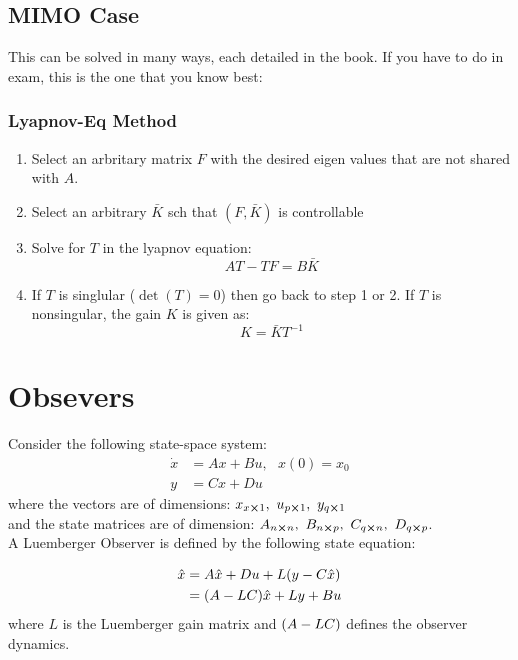 \documentclass[]{article}
\begin{document}
	\subsection*{MIMO Case}
		This can be solved in many ways, each detailed in the book. If you have to do in exam, this is the one that  you know best:
		\subsubsection*{Lyapnov-Eq Method}
		\begin{enumerate}
			\item Select an arbritary matrix $F$ with the desired eigen values that are not shared with $A$.
			\item Select an arbitrary $\bar{K}$ sch that $(F,\bar{K})$ is controllable
			\item Solve for $T$ in the lyapnov equation:
			\begin{displaymath}
				A T - T F = B \bar{K}
			\end{displaymath}
			\item If $T$ is singlular ($\det(T) = 0$) then go back to step 1 or 2. If $T$ is nonsingular, the gain $K$ is given as:
			\begin{displaymath}
				K = \bar{K} T^{-1}
			\end{displaymath}
		\end{enumerate}
	
	

\section*{Obsevers}
	Consider the following state-space system:
	\begin{align*}
		\dot{x}	&= A x + B u, \ \ \ x(0)=x_0\\
		y		&= C x + D u
	\end{align*}
	where the vectors are of dimensions: $x_{x\cross1},\ u_{p\cross1},\ y_{q\cross1}$\\
	and the state matrices are of dimension: $A_{n \cross n},\ B_{n \cross p},\ C_{q\cross n},\ D_{q\cross p}$.\\
	A Luemberger Observer is defined by the following state equation:
	
	\begin{equation}
		\begin{aligned}
			\hat{x} &= A \hat{x} + D u + L \qty(y - C \hat{x})\\
			&= \qty(A - L C) \hat{x} + L y + B u
		\end{aligned}
		\label{eq:luemberger_observer}
	\end{equation}
	where $L$ is the Luemberger gain matrix and $\qty(A - LC)$ defines the observer dynamics.
	
\end{document}
